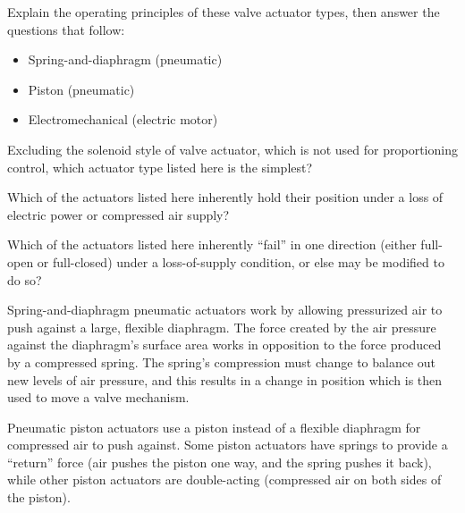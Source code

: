 

Explain the operating principles of these valve actuator types, then answer the questions that follow:

\begin{itemize}
\item{}Spring-and-diaphragm (pneumatic)
\item{}Piston (pneumatic)
\item{}Electromechanical (electric motor)
\end{itemize}

\vskip 10pt

Excluding the solenoid style of valve actuator, which is not used for proportioning control, which actuator type listed here is the simplest?

\vskip 10pt

Which of the actuators listed here inherently hold their position under a loss of electric power or compressed air supply?

\vskip 10pt

Which of the actuators listed here inherently ``fail'' in one direction (either full-open or full-closed) under a loss-of-supply condition, or else may be modified to do so?







Spring-and-diaphragm pneumatic actuators work by allowing pressurized air to push against a large, flexible diaphragm.  The force created by the air pressure against the diaphragm's surface area works in opposition to the force produced by a compressed spring.  The spring's compression must change to balance out new levels of air pressure, and this results in a change in position which is then used to move a valve mechanism.

\vskip 10pt

Pneumatic piston actuators use a piston instead of a flexible diaphragm for compressed air to push against.  Some piston actuators have springs to provide a ``return'' force (air pushes the piston one way, and the spring pushes it back), while other piston actuators are double-acting (compressed air on both sides of the piston).

